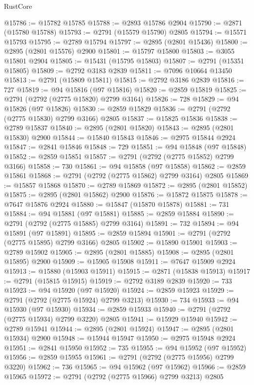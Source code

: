 \begin{lexlean}{RustCore}
\begin{coremodule}
@15786 := @15782 @15785
@15788 := @2893 @15786 @2904
@15790 := @2871 (@15780 @15788)
@15793 := @2791 (@15579 @15790) @2805
@15794 := @15571 @15793
@15795 := @2789 @15794
@15797 := @2895 (@2801 @15436)
@15800 := @2895 (@2801 @15576) @2900
@15801 := @15797 @15800
@15803 := @3055 @15801 @2904
@15805 := @15431 (@15795 @15803)
@15807 := @2791 (@15351 @15805)
@15809 := @2792 @3183 @2839
@15811 := @7096 @10664 @13450
@15813 := @2791 (@15809 @15811)
@15815 := @2792 @3186 @2839
@15816 := 727
@15819 := @94 @15816 (@97 @15816)
@15820 := @2859 @15819
@15825 := @2791 (@2792 (@2775 @15820) @2799 @3164)
@15826 := 728
@15829 := @94 @15826 (@97 @15826)
@15830 := @2859 @15829
@15836 := @2791 (@2792 (@2775 @15830) @2799 @3166) @2805
@15837 := @15825 @15836
@15838 := @2789 @15837
@15840 := @2895 (@2801 @15820)
@15843 := @2895 (@2801 @15830) @2900
@15844 := @15840 @15843
@15846 := @2975 @15844 @2924
@15847 := @2841 @15846
@15848 := 729
@15851 := @94 @15848 (@97 @15848)
@15852 := @2859 @15851
@15857 := @2791 (@2792 (@2775 @15852) @2799 @3166)
@15858 := 730
@15861 := @94 @15858 (@97 @15858)
@15862 := @2859 @15861
@15868 := @2791 (@2792 (@2775 @15862) @2799 @3164) @2805
@15869 := @15857 @15868
@15870 := @2789 @15869
@15872 := @2895 (@2801 @15852)
@15875 := @2895 (@2801 @15862) @2900
@15876 := @15872 @15875
@15878 := @7647 @15876 @2924
@15880 := @15847 (@15870 @15878)
@15881 := 731
@15884 := @94 @15881 (@97 @15881)
@15885 := @2859 @15884
@15890 := @2791 (@2792 (@2775 @15885) @2799 @3164)
@15891 := 732
@15894 := @94 @15891 (@97 @15891)
@15895 := @2859 @15894
@15901 := @2791 (@2792 (@2775 @15895) @2799 @3166) @2805
@15902 := @15890 @15901
@15903 := @2789 @15902
@15905 := @2895 (@2801 @15885)
@15908 := @2895 (@2801 @15895) @2900
@15909 := @15905 @15908
@15911 := @7647 @15909 @2924
@15913 := @15880 (@15903 @15911)
@15915 := @2871 (@15838 @15913)
@15917 := @2791 (@15815 @15915)
@15919 := @2792 @3189 @2839
@15920 := 733
@15923 := @94 @15920 (@97 @15920)
@15924 := @2859 @15923
@15929 := @2791 (@2792 (@2775 @15924) @2799 @3213)
@15930 := 734
@15933 := @94 @15930 (@97 @15930)
@15934 := @2859 @15933
@15940 := @2791 (@2792 (@2775 @15934) @2799 @3220) @2805
@15941 := @15929 @15940
@15942 := @2789 @15941
@15944 := @2895 (@2801 @15924)
@15947 := @2895 (@2801 @15934) @2900
@15948 := @15944 @15947
@15950 := @2975 @15948 @2924
@15951 := @2841 @15950
@15952 := 735
@15955 := @94 @15952 (@97 @15952)
@15956 := @2859 @15955
@15961 := @2791 (@2792 (@2775 @15956) @2799 @3220)
@15962 := 736
@15965 := @94 @15962 (@97 @15962)
@15966 := @2859 @15965
@15972 := @2791 (@2792 (@2775 @15966) @2799 @3213) @2805

\end{coremodule}
\end{lexlean}
